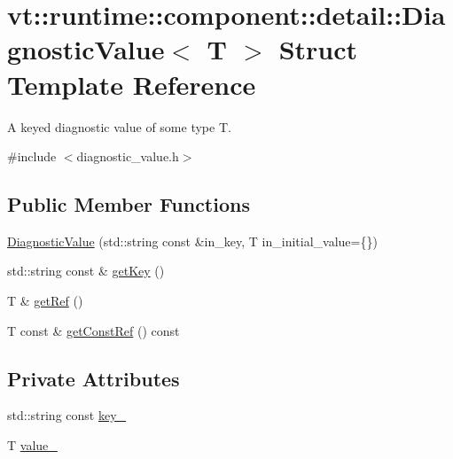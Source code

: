 \hypertarget{structvt_1_1runtime_1_1component_1_1detail_1_1_diagnostic_value}{}\section{vt\+:\+:runtime\+:\+:component\+:\+:detail\+:\+:Diagnostic\+Value$<$ T $>$ Struct Template Reference}
\label{structvt_1_1runtime_1_1component_1_1detail_1_1_diagnostic_value}


A keyed diagnostic value of some type {\ttfamily T}.  




{\ttfamily \#include $<$diagnostic\+\_\+value.\+h$>$}

\subsection*{Public Member Functions}
\begin{DoxyCompactItemize}
\item 
\hyperlink{structvt_1_1runtime_1_1component_1_1detail_1_1_diagnostic_value_a76d0ead613d3a4b1a9a46eb23317066d}{Diagnostic\+Value} (std\+::string const \&in\+\_\+key, T in\+\_\+initial\+\_\+value=\{\})
\item 
std\+::string const  \& \hyperlink{structvt_1_1runtime_1_1component_1_1detail_1_1_diagnostic_value_a3db26a4eb88f34da6872f435f3310406}{get\+Key} ()
\item 
T \& \hyperlink{structvt_1_1runtime_1_1component_1_1detail_1_1_diagnostic_value_a1a7da0106345e32a753d8ee8e1df29c9}{get\+Ref} ()
\item 
T const  \& \hyperlink{structvt_1_1runtime_1_1component_1_1detail_1_1_diagnostic_value_a985b2e0d7afaa9f424e92411b82dbd32}{get\+Const\+Ref} () const
\end{DoxyCompactItemize}
\subsection*{Private Attributes}
\begin{DoxyCompactItemize}
\item 
std\+::string const \hyperlink{structvt_1_1runtime_1_1component_1_1detail_1_1_diagnostic_value_a37d702312b9f5335ed55162ca52b5c80}{key\+\_\+}
\item 
T \hyperlink{structvt_1_1runtime_1_1component_1_1detail_1_1_diagnostic_value_a3d5a79e194a5c34bdbf1fe7b233ea264}{value\+\_\+}
\end{DoxyCompactItemize}


